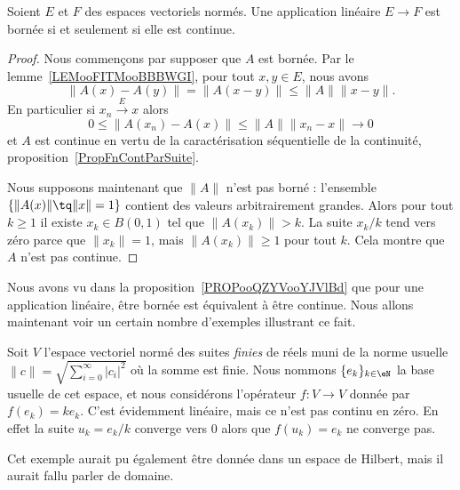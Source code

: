 \begin{proposition}       \label{PROPooQZYVooYJVlBd}
    Soient \( E\) et \( F\) des espaces vectoriels normés. Une application linéaire \( E\to F\) est bornée si et seulement si elle est continue.
\end{proposition}

\begin{proof}
    Nous commençons par supposer que \( A\) est bornée. Par le lemme~\ref{LEMooFITMooBBBWGI}, pour tout \( x,y\in E\), nous avons
    \begin{equation}
        \| A(x)-A(y) \|=\| A(x-y) \|\leq \| A \|\| x-y \|.
    \end{equation}
    En particulier si \( x_n\stackrel{E}{\longrightarrow}x\) alors
    \begin{equation}
        0\leq \| A(x_n)-A(x) \|\leq \| A \|\| x_n-x \|\to 0
    \end{equation}
    et \( A\) est continue en vertu de la caractérisation séquentielle de la continuité, proposition~\ref{PropFnContParSuite}.

    Nous supposons maintenant que \( \| A \|\) n'est pas borné : l'ensemble \( \{ \| A(x) \|\tq \| x \|=1 \}\) contient des valeurs arbitrairement grandes. Alors pour tout \( k\geq 1\) il existe \( x_k\in B(0,1)\) tel que \( \| A(x_k) \|>k\). La suite \( x_k/k\) tend vers zéro parce que \( \| x_k \|=1\), mais \( \| A(x_k) \|\geq 1\) pour tout \( k\). Cela montre que \( A\) n'est pas continue.
\end{proof}


Nous avons vu dans la proposition~\ref{PROPooQZYVooYJVlBd} que pour une application linéaire, être bornée est équivalent à être continue. Nous allons maintenant voir un certain nombre d'exemples illustrant ce fait.

\begin{example}  \label{ExHKsIelG}
    Soit \( V\) l'espace vectoriel normé des suites \emph{finies} de réels muni de la norme usuelle $\| c \|=\sqrt{\sum_{i=0}^{\infty}| c_i |^2}$ où la somme est finie. Nous nommons \( \{ e_k \}_{k\in \eN}\) la base usuelle de cet espace, et nous considérons l'opérateur \( f\colon V\to V\) donnée par \( f(e_k)=ke_k\). C'est évidemment linéaire, mais ce n'est pas continu en zéro. En effet la suite \( u_k=e_k/k\) converge vers \( 0\) alors que \( f(u_k)=e_k\) ne converge pas.
\end{example}

Cet exemple aurait pu également être donnée dans un espace de Hilbert, mais il aurait fallu parler de domaine.

